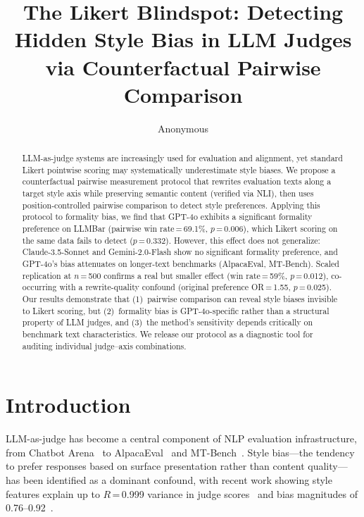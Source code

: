 \documentclass[11pt,a4paper]{article}
\title{The Likert Blindspot: Detecting Hidden Style Bias in LLM Judges\\via Counterfactual Pairwise Comparison}
\author{Anonymous}
\begin{document}
\maketitle

\begin{abstract}
LLM-as-judge systems are increasingly used for evaluation and alignment, yet standard Likert pointwise scoring may systematically underestimate style biases.
We propose a counterfactual pairwise measurement protocol that rewrites evaluation texts along a target style axis while preserving semantic content (verified via NLI), then uses position-controlled pairwise comparison to detect style preferences.
Applying this protocol to formality bias, we find that GPT-4o exhibits a significant formality preference on LLMBar (pairwise win rate\,=\,69.1\%, $p$\,=\,0.006), which Likert scoring on the same data fails to detect ($p$\,=\,0.332).
However, this effect does not generalize: Claude-3.5-Sonnet and Gemini-2.0-Flash show no significant formality preference, and GPT-4o's bias attenuates on longer-text benchmarks (AlpacaEval, MT-Bench).
Scaled replication at $n$\,=\,500 confirms a real but smaller effect (win rate\,=\,59\%, $p$\,=\,0.012), co-occurring with a rewrite-quality confound (original preference OR\,=\,1.55, $p$\,=\,0.025).
Our results demonstrate that (1)~pairwise comparison can reveal style biases invisible to Likert scoring, but (2)~formality bias is GPT-4o-specific rather than a structural property of LLM judges, and (3)~the method's sensitivity depends critically on benchmark text characteristics.
We release our protocol as a diagnostic tool for auditing individual judge--axis combinations.
\end{abstract}

\section{Introduction}

LLM-as-judge has become a central component of NLP evaluation infrastructure, from Chatbot Arena~\cite{zheng2023judging} to AlpacaEval~\cite{li2024alpacaeval} and MT-Bench~\cite{zheng2023judging}.
Style bias---the tendency to prefer responses based on surface presentation rather than content quality---has been identified as a dominant confound, with recent work showing style features explain up to $R$\,=\,0.999 variance in judge scores~\cite{sosbench2025} and bias magnitudes of 0.76--0.92~\cite{soumik2026}.
\end{document}
